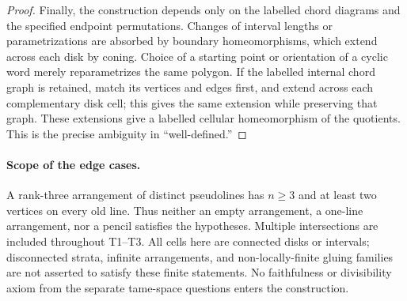 \begin{proof}
Finally, the construction depends only on the labelled chord diagrams
and the specified endpoint permutations. Changes of interval lengths
or parametrizations are absorbed by boundary homeomorphisms, which
extend across each disk by coning. Choice of a starting point or
orientation of a cyclic word merely reparametrizes the same polygon.
If the labelled internal chord graph is retained, match its vertices
and edges first, and extend across each complementary disk cell;
this gives the same extension while preserving that graph. These
extensions give a labelled cellular homeomorphism of the quotients.
This is the precise ambiguity in ``well-defined.''
\end{proof}

\paragraph{Scope of the edge cases.}
A rank-three arrangement of distinct pseudolines has $n\geq3$ and at
least two vertices on every old line. Thus neither an empty arrangement,
a one-line arrangement, nor a pencil satisfies the hypotheses. Multiple
intersections are included throughout T1--T3. All cells here are connected
disks or intervals; disconnected strata, infinite arrangements, and
non-locally-finite gluing families are not asserted to satisfy these
finite statements. No faithfulness or divisibility axiom from the
separate tame-space questions enters the construction.
